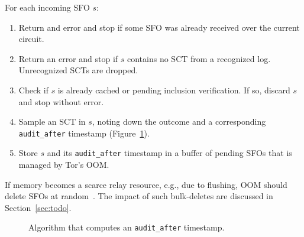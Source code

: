 For each incoming SFO $s$:
\begin{enumerate}
	\item\label{enm:ctr-api:incoming} Return and error and stop if some SFO was
		already received over the current circuit.
	\item\label{enm:ctr-api:well-formed} Return an error and stop if $s$
		contains no SCT from a recognized log.  Unrecognized SCTs are dropped.
	\item\label{enm:ctr-api:cached} Check if $s$ is already cached or pending
		inclusion verification.  If so, discard $s$ and stop without error.
	\item\label{enm:ctr-api:audit-after} Sample an SCT in $s$, noting down the
		outcome and a corresponding \texttt{audit\_after} timestamp
		(Figure~\ref{fig:audit-after}).
	\item\label{enm:ctr-api:store} Store $s$ and its \texttt{audit\_after}
		timestamp in a buffer of pending SFOs that is managed by Tor's OOM.
\end{enumerate}

If memory becomes a scarce relay resource, e.g., due to flushing, OOM
should delete SFOs at random~\cite{nordberg}.  The impact of such bulk-deletes
are discussed in Section~\ref{sec:todo}.

\begin{figure}
	\centering
	\caption{%
		Algorithm that computes an \texttt{audit\_after} timestamp.
	}
	\label{fig:audit-after}
\end{figure}


